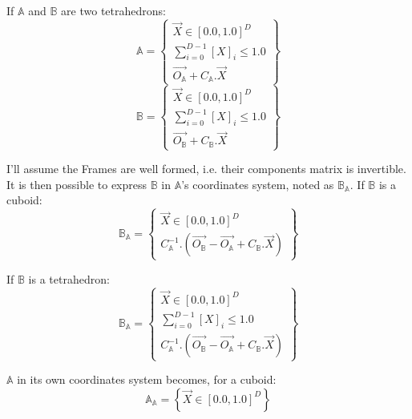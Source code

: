 \documentclass[12pt, a4paper]{article}
\begin{document}
If $\mathbb{A}$ and $\mathbb{B}$ are two tetrahedrons:
\begin{equation}
\mathbb{A}=\left\lbrace
\begin{array}{c}
\overrightarrow{X}\in[0.0,1.0]^D\\
\sum_{i=0}^{D-1}\left[X\right]_i\le1.0\\
\overrightarrow{O_\mathbb{A}}+C_\mathbb{A}.\overrightarrow{X}
\end{array}
\right\rbrace
\end{equation}
\begin{equation}
\mathbb{B}=\left\lbrace
\begin{array}{c}
\overrightarrow{X}\in[0.0,1.0]^D\\
\sum_{i=0}^{D-1}\left[X\right]_i\le1.0\\
\overrightarrow{O_\mathbb{B}}+C_\mathbb{B}.\overrightarrow{X}
\end{array}
\right\rbrace
\end{equation}

I'll assume the Frames are well formed, i.e. their components matrix is invertible. It is then possible to express $\mathbb{B}$ in $\mathbb{A}$'s coordinates system, noted as $\mathbb{B}_\mathbb{A}$. If $\mathbb{B}$ is a cuboid:
\begin{equation}
\mathbb{B}_\mathbb{A}=\left\lbrace
\begin{array}{c}
\overrightarrow{X}\in[0.0,1.0]^D\\
C_\mathbb{A}^{-1}.(\overrightarrow{O_\mathbb{B}}-\overrightarrow{O_\mathbb{A}}+C_\mathbb{B}.\overrightarrow{X})
\end{array}
\right\rbrace
\end{equation}

If $\mathbb{B}$ is a tetrahedron:
\begin{equation}
\mathbb{B}_\mathbb{A}=\left\lbrace
\begin{array}{c}
\overrightarrow{X}\in[0.0,1.0]^D\\
\sum_{i=0}^{D-1}\left[X\right]_i\le1.0\\
C_\mathbb{A}^{-1}.(\overrightarrow{O_\mathbb{B}}-\overrightarrow{O_\mathbb{A}}+C_\mathbb{B}.\overrightarrow{X})
\end{array}
\right\rbrace
\end{equation}

$\mathbb{A}$ in its own coordinates system becomes, for a cuboid:
\begin{equation}
\mathbb{A}_\mathbb{A}=\left\lbrace\overrightarrow{X}\in[0.0,1.0]^D\right\rbrace
\end{equation}
\end{document}
